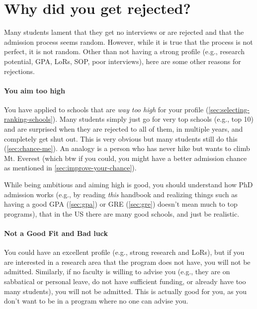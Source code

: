 \documentclass[oneside,11pt,dvipsnames]{book}
\newcommand{\subsectioninfo}[1]{%
  \phantomsection
  \addcontentsline{toc}{subsectioninfo}{\textcolor{black}{\texttt #1}}%
}
\begin{document}
\section{Why did you get rejected?}\label{sec:why-rejected}
\subsectioninfo{You aim too high, are overqualified, or even because you applied to AI/ML, a super competitive field in recent years with many applicants.}

Many students lament that they get no interviews or are rejected and that the admission process seems random.  However, while it is true that the process is not perfect, it is not random.
Other than not having a strong profile (e.g., research potential, GPA, LoRs, SOP, poor interviews), here are some other reasons for rejections.

\paragraph{You aim too high} 
You have applied to schools that are \emph{way too high} for your profile (\autoref{sec:selecting-ranking-schools}). Many students simply just go for very top schools (e.g., top 10) and are surprised when they are rejected to all of them, in multiple years, and completely get shut out.  This is very obvious but many students still do this (\autoref{sec:chance-me}). An analogy is a person who has never hike but wants to climb Mt. Everest (which btw if you could, you might have a better admission chance as mentioned in \autoref{sec:improve-your-chance}).

While being ambitious and aiming high is good, you should understand how PhD admission works (e.g., by reading \emph{this} handbook and realizing things such as having a good GPA (\autoref{sec:gpa}) or GRE (\autoref{sec:gre}) doesn't mean much to top programs), that in the US there are many good schools, and just be realistic. 

\paragraph{Not a Good Fit and Bad luck}  You could have an excellent profile (e.g., strong research and LoRs), but if you are interested in a research area that the program does not have, you will not be admitted.
Similarly, if no faculty is willing to advise you (e.g., they are on sabbatical or personal leave, do not have sufficient funding, or already have too many students), you will not be admitted.  This is actually good for you, as you don't want to be in a program where no one can advise you.
\end{document}
